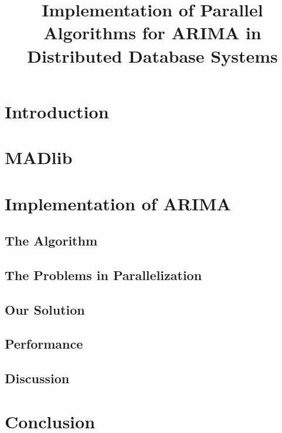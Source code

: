 \documentclass[english,12pt]{article}
\begin{document}
\title{Implementation of Parallel Algorithms for ARIMA in Distributed
  Database Systems}


\maketitle

\begin{abstract}

\end{abstract}

\section{Introduction}


\section{MADlib}


\section{Implementation of ARIMA}


\subsection{The Algorithm}


\subsection{The Problems in Parallelization}


\subsection{Our Solution}


\subsection{Performance}


\subsection{Discussion}


\section{Conclusion}

% 
% 
\end{document}
